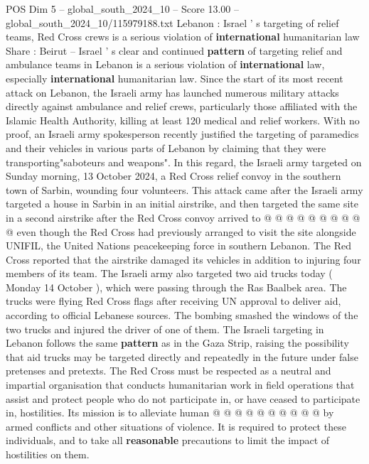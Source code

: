 \begin{textsample}{POS Dim 5 – global\_south\_2024\_10 – Score 13.00 – global\_south\_2024\_10/115979188.txt}  \label{ex:f5_pos_350}
Lebanon : Israel ' s targeting of relief teams, Red Cross crews is a serious violation of \textbf{international} humanitarian law Share : Beirut -- Israel ' s clear and continued \textbf{pattern} of targeting relief and ambulance teams in Lebanon is a serious violation of \textbf{international} law, especially \textbf{international} humanitarian law.
Since the start of its most recent attack on Lebanon, the Israeli army has launched numerous military attacks directly against ambulance and relief crews, particularly those affiliated with the Islamic Health Authority, killing at least 120 medical and relief workers.
With no proof, an Israeli army spokesperson recently justified the targeting of paramedics and their vehicles in various parts of Lebanon by claiming that they were transporting"saboteurs and weapons".
In this regard, the Israeli army targeted on Sunday morning, 13 October 2024, a Red Cross relief convoy in the southern town of Sarbin, wounding four volunteers.
This attack came after the Israeli army targeted a house in Sarbin in an initial airstrike, and then targeted the same site in a second airstrike after the Red Cross convoy arrived to @ @ @ @ @ @ @ @ @ @ even though the Red Cross had previously arranged to visit the site alongside UNIFIL, the United Nations peacekeeping force in southern Lebanon.
The Red Cross reported that the airstrike damaged its vehicles in addition to injuring four members of its team.
The Israeli army also targeted two aid trucks today ( Monday 14 October ), which were passing through the Ras Baalbek area.
The trucks were flying Red Cross flags after receiving UN approval to deliver aid, according to official Lebanese sources.
The bombing smashed the windows of the two trucks and injured the driver of one of them.
The Israeli targeting in Lebanon follows the same \textbf{pattern} as in the Gaza Strip, raising the possibility that aid trucks may be targeted directly and repeatedly in the future under false pretenses and pretexts.
The Red Cross must be respected as a neutral and impartial organisation that conducts humanitarian work in field operations that assist and protect people who do not participate in, or have ceased to participate in, hostilities.
Its mission is to alleviate human @ @ @ @ @ @ @ @ @ @ by armed conflicts and other situations of violence.
It is required to protect these individuals, and to take all \textbf{reasonable} precautions to limit the impact of hostilities on them.

\end{textsample}
